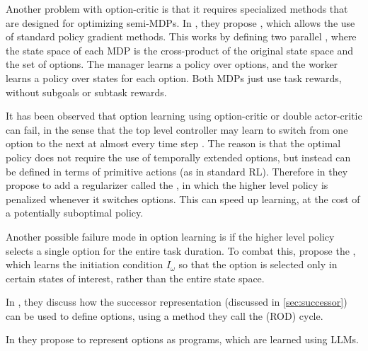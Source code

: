 Another problem with option-critic is that it requires
specialized methods that are designed for optimizing semi-MDPs.
In \citep{Zhang2019dac}, they propose
,
which allows the use of standard policy gradient methods.
This works  by defining two parallel
,
where the state space of each MDP is the cross-product
of the original state space and the set of options.
The manager learns a policy over options,
and the worker learns a policy over states for each option.
Both MDPs just use task rewards, without subgoals or
subtask rewards.

It has been observed that
option learning using option-critic or double actor-critic can fail,
in the sense that the top level controller
may learn to switch from one option to the next at almost
every time step
\citep{Zhang2019dac,Harb2018}.
The reason is that the
optimal policy does not require
the use of temporally extended options,
but instead can be defined in terms of primitive actions
(as in standard RL).
Therefore in
\citep{Harb2018} they propose to add a regularizer
called the ,
in which the higher level policy is penalized
whenever it switches options.
This can speed up learning, at the cost of a potentially
suboptimal policy.

Another possible failure mode in option learning
is if the higher level policy selects a single
option for the entire task duration.
To combat this, \citep{Khetarpal2019} propose the
,
which learns the  initiation condition $I_{\omega}$
so that the option is selected
only in certain states of interest,
rather than the entire state space.

In \citep{Machado2023}, they discuss how the successor
representation (discussed in \cref{sec:successor})
can be used to define options,
using a method they call the  (ROD) cycle.

In \citep{Lin2024nips} they propose to represent options as programs,
which are learned using LLMs.




